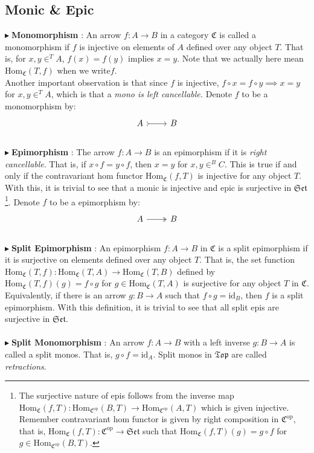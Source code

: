 \documentclass{article}
\theoremstyle{definition}
\theoremstyle{remark}
\theoremstyle{definition}
\theoremstyle{definition}
\theoremstyle{definition}
\newcommand{\cat}[1]{\mathfrak{#1}}
\newcommand{\opcat}[1]{\mathfrak{#1}^{\text{op}}}
\newcommand{\Id}[1]{\text{id}_{#1}}
\newcommand{\homset}[3]{\text{Hom}_{#1}(#2,#3)}
\newcommand{\point}[0]{$\blacktriangleright\;$}
\newcommand{\elem}[1]{\in ^{#1}}
\begin{document}
\subsection{Monic \& Epic} 
\point \textbf{Monomorphism} : An arrow $ f :A\to B $ in a category $ \cat{C} $ is called a monomorphism if $ f $ is injective on elements of $ A $ defined over any object $ T $. That is, for $ x,y\elem{T} A $, $ f(x) = f(y) $ implies $ x=y $. Note that we actually here mean $ \homset{\cat{C}}{T}{f} $ when we write$ f $.\\
Another important observation is that since $ f $ is injective, $ f\circ x = f\circ y \implies x = y $ for $ x,y \elem{T} A $, which is that a \emph{mono is left cancellable.} Denote $ f $ to be a monomorphism by:
\[\begin{tikzcd}
	A & B
	\arrow[tail, from=1-1, to=1-2]
\end{tikzcd}\]
\\
\point  \textbf{Epimorphism} : The arrow $ f : A\to B$ is an epimorphism if it is \emph{right cancellable}. That is, if $ x\circ f = y\circ f $, then $ x=y $ for $ x,y \elem{B} C $. This is true if and only if the contravariant hom functor $ \homset{\cat{C}}{f}{T} $ is injective for any object $ T $. With this, it is trivial to see that a monic is injective and epic is surjective in $ \cat{Set} $\footnote{The surjective nature of epis follows from the inverse map $ \homset{\cat{C}}{f}{T} : \homset{\opcat{C}}{B}{T} \to \homset{\opcat{C}}{A}{T} $ which is given injective. Remember contravariant hom functor is given by right composition in $ \opcat{C} $, that is, $ \homset{\cat{C}}{f}{T} : \opcat{C} \to \cat{Set} $ such that $ \homset{\cat{C}}{f}{T} (g) = g\circ f$ for $ g\in \homset{\opcat{C}}{B}{T} $. }. Denote $ f  $ to be a epimorphism by:
\[\begin{tikzcd}
	A & B
	\arrow[two heads, from=1-1, to=1-2]
\end{tikzcd}\]
\\
\point \textbf{Split Epimorphism} : An epimorphism $ f : A\to B $ in $ \cat{C} $ is a split epimorphism if it is surjective on elements defined over any object $ T $. That is, the set function $ \homset{\cat{C}}{T}{f} : \homset{\cat{C}}{T}{A} \to \homset{\cat{C}}{T}{B} $ defined by $ \homset{\cat{C}}{T}{f} (g) = f\circ g$ for $ g\in 
\homset{\cat{C}}{T}{A} $ is surjective for any object $ T $ in $ \cat{C} $.\\
Equivalently, if there is an arrow $ g : B\to A $ such that $ f\circ g = \Id{B} $, then $ f $ is a split epimorphism. With this definition, it is trivial to see that all split epis are surjective in $ \cat{Set} $.
\\\\
\point \textbf{Split Monomorphism} : An arrow $ f : A\to B $ with a left inverse $ g : B\to A $ is called a split monos. That is, $ g\circ f = \Id{A} $. Split monos in $ \cat{Top} $ are called \emph{retractions}.
\end{document}
